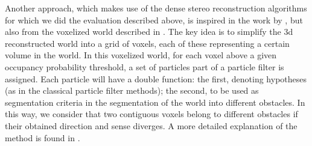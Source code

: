 
Another approach, which makes use of the dense stereo reconstruction algorithms for which we did the evaluation described above, is inspired in the work by \cite{danescu2010particle}, but also from the voxelized world described in \cite{broggi2013}. The key idea is to simplify the 3d reconstructed world into a grid of voxels, each of these representing a certain volume in the world. In this voxelized world, for each voxel above a given occupancy probability threshold, a set of particles part of a particle filter is assigned. Each particle will have a double function: the first, denoting hypotheses (as in the classical particle filter methods); the second, to be used as segmentation criteria in the segmentation of the world into different obstacles. In this way, we consider that two contiguous voxels belong to different obstacles if their obtained direction and sense diverges. A more detailed explanation of the method is found in \todo{\ref{XXX}}.

